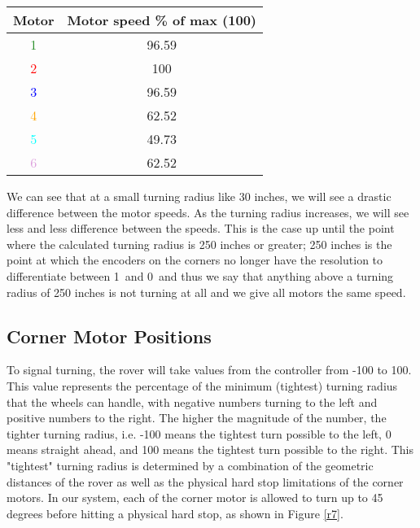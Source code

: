 \documentclass[12pt]{article}
\begin{document}
\bigskip


\begin{centering}	
	
\begin{tabular}[2]{|c|c|}

	\hline
	\textbf{Motor} & \textbf{Motor speed \% of max (100)} \\ \hline
	\textcolor{ForestGreen}{1} & 96.59 \\ \hline
	\textcolor{red}{2} & 100 \\ \hline
	\textcolor{blue}{3} & 96.59\\ \hline
	\textcolor{orange}{4} & 62.52 \\ \hline
	\textcolor{cyan}{5} & 49.73\\ \hline
	\textcolor{Plum}{6} & 62.52\\ \hline


\end{tabular}

\end{centering}
\bigskip 
\noindent We can see that at a small turning radius like 30 inches, we will see a drastic difference between the motor speeds. As the turning radius increases, we will see less and less difference between the speeds.  This is the case up until the point where the calculated turning radius is 250 inches or greater; 250 inches is the point at which the encoders on the corners no longer have the resolution to differentiate between 1\degree\ and 0\degree\ and thus we say that anything above a turning radius of 250 inches is not turning at all and we give all motors the same speed.

\subsection{Corner Motor Positions}

To signal turning, the rover will take values from the controller from -100 to 100. This value represents the percentage of the minimum (tightest) turning radius that the wheels can handle, with negative numbers turning to the left and positive numbers to the right. The higher the magnitude of the number, the tighter turning radius, i.e. -100 means the tightest turn possible to the left, 0 means straight ahead, and 100 means the tightest turn possible to the right. This "tightest" turning radius is determined by a combination of the geometric distances of the rover as well as the physical hard stop limitations of the corner motors. In our system, each of the corner motor is allowed to turn up to 45 degrees before hitting a physical hard stop, as shown in Figure \ref{r7}.
\end{document}
